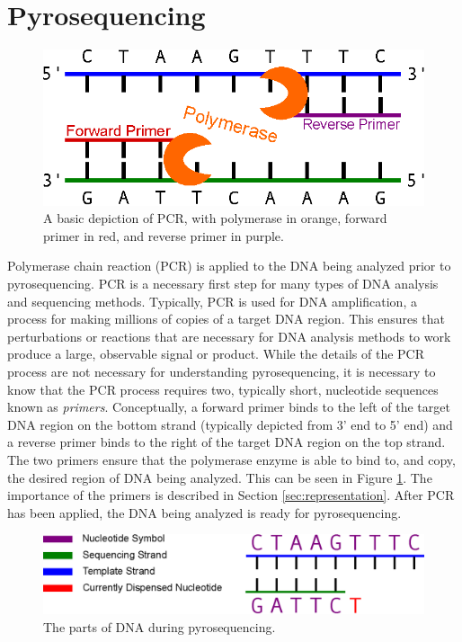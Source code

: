 \documentclass[12pt]{ucthesis}
\begin{document}
   \section{Pyrosequencing}\label{sec:pyrosequencing}
      \begin{figure}[t]
         \centering
         \includegraphics[width=\textwidth]{graphics/PCR.eps}
         \caption{A basic depiction of PCR, with polymerase in orange, forward
                  primer in red, and reverse primer in purple.}
         \label{fig:pcr}
      \end{figure}

      Polymerase chain reaction (PCR) is applied to the DNA being analyzed
      prior to pyrosequencing. PCR is a necessary first step
      for many types of DNA analysis and sequencing methods. Typically, PCR is
      used for DNA amplification, a process for making millions of copies of a
      target DNA region. This ensures that perturbations or reactions that are
      necessary for DNA analysis methods to work produce a large, observable
      signal or product. While the details of the PCR process are not necessary
      for understanding pyrosequencing, it is necessary to know that the PCR
      process requires two, typically short, nucleotide sequences known as
      \textit{primers}. Conceptually, a forward primer binds to the left of the
      target DNA region on the bottom strand (typically depicted from 3' end to
      5' end) and a reverse primer binds to the right of the target DNA region
      on the top strand. The two primers ensure that the polymerase enzyme is
      able to bind to, and copy, the desired region of DNA being analyzed. This
      can be seen in Figure \ref{fig:pcr}. The importance of the primers is
      described in Section \ref{sec:representation}. After PCR has been
      applied, the DNA being analyzed is ready for pyrosequencing.

      \begin{figure}[b]
         \centering
         \includegraphics[width=\textwidth]{graphics/PyrosequencingComponents.eps}
         \caption{The parts of DNA during pyrosequencing.}
         \label{fig:pyrosequencing_legend}
      \end{figure}
\end{document}
